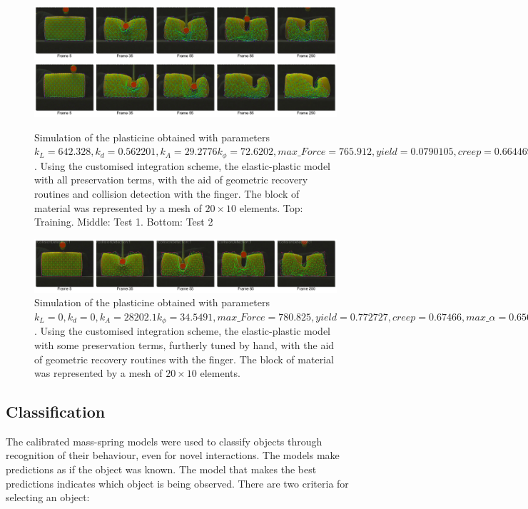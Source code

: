 \documentclass[journal]{IEEEtran}
\begin{document}
\begin{figure}[!t]
\centering
\includegraphics[width=178mm]{arrio12}
\includegraphics[width=178mm]{arrio13}
\caption{Simulation of the plasticine obtained with parameters $k_L=642.328, k_d=0.562201, k_A=29.2776 k_{\phi}=72.6202, max\_Force=765.912, yield=0.0790105, creep=0.664469, max\_\alpha=0.48842$.  Using the customised integration scheme, the elastic-plastic model with all preservation terms, with the aid of geometric recovery routines and collision detection with the finger.  The block of material was represented by a mesh of $20 \times 10$ elements. Top: Training. Middle: Test 1. Bottom: Test 2}\label{fig:simulation_plasticine}
\end{figure}

\begin{figure}[!t]
\centering
\includegraphics[width=178mm]{arrio16}
\caption{Simulation of the plasticine obtained with parameters $k_L=0, k_d=0, k_A=28202.1 k_{\phi}=34.5491, max\_Force=780.825, yield=0.772727, creep=0.67466, max\_\alpha=0.656572$.  Using the customised integration scheme, the elastic-plastic model with some preservation terms, furtherly tuned by hand,  with the aid of geometric recovery routines with the finger.  The block of material was represented by a mesh of $20 \times 10$ elements.}\label{fig:simulation_plasticine_hand}
\end{figure}

\subsection{Classification}

The calibrated mass-spring models were used to classify objects through recognition of their behaviour, even for novel interactions.  The models make predictions as if the object was known.  The model that makes the best predictions indicates which object is being observed.  There are two criteria for selecting an object:
\end{document}
